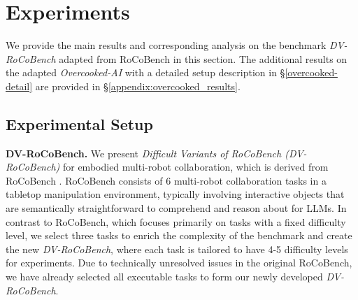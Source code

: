 \documentclass[11pt]{article}
\theoremstyle{plain}
\theoremstyle{remark}
\begin{document}
\vspace{-0.3em}
\section{Experiments}
\vspace{-0.3em}
We provide the main results and corresponding analysis on the benchmark \emph{DV-RoCoBench} adapted from RoCoBench \citep{mandi2023roco} in this section. The additional results on the adapted \emph{Overcooked-AI} \citep{micah2019overcooked_ai} with a detailed setup description in \S\ref{overcooked-detail} are provided in \S\ref{appendix:overcooked_results}.

\subsection{Experimental Setup}\label{section:5-1}
\textbf{DV-RoCoBench.} 
We present \emph{Difficult Variants of RoCoBench (DV-RoCoBench)} for embodied multi-robot collaboration, which is derived from RoCoBench \citep{mandi2023roco}.
RoCoBench consists of 6 multi-robot collaboration tasks in a tabletop manipulation environment, typically involving interactive objects that are semantically straightforward to comprehend and reason about for LLMs.
In contrast to RoCoBench, which focuses primarily on tasks with a fixed difficulty level, we select three tasks to enrich the complexity of the benchmark and create the new \emph{DV-RoCoBench}, where each task is tailored to have 4-5 difficulty levels for experiments. Due to technically unresolved issues in the original RoCoBench, we have already selected all executable tasks to form our newly developed \emph{DV-RoCoBench}.
\end{document}
